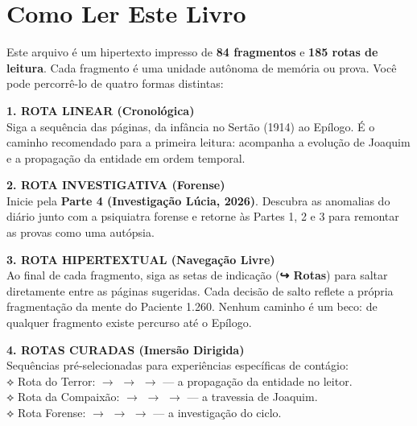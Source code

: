 \cleardoublepage
\thispagestyle{empty}
\chapter*{Como Ler Este Livro}

\begingroup

Este arquivo é um hipertexto impresso de \textbf{84 fragmentos} e \textbf{185 rotas de leitura}. Cada fragmento é uma unidade autônoma de memória ou prova. Você pode percorrê-lo de quatro formas distintas:

\vspace{0.8em}

\noindent\textbf{1. ROTA LINEAR (Cronológica)}\\
\noindent Siga a sequência das páginas, da infância no Sertão (1914) ao Epílogo. É o caminho recomendado para a primeira leitura: acompanha a evolução de Joaquim e a propagação da entidade em ordem temporal.

\vspace{0.5em}

\noindent\textbf{2. ROTA INVESTIGATIVA (Forense)}\\
\noindent Inicie pela \textbf{Parte 4 (Investigação Lúcia, 2026)}. Descubra as anomalias do diário junto com a psiquiatra forense e retorne às Partes 1, 2 e 3 para remontar as provas como uma autópsia.

\vspace{0.5em}

\noindent\textbf{3. ROTA HIPERTEXTUAL (Navegação Livre)}\\
\noindent Ao final de cada fragmento, siga as setas de indicação (\textbf{↪ Rotas}) para saltar diretamente entre as páginas sugeridas. Cada decisão de salto reflete a própria fragmentação da mente do Paciente 1.260. Nenhum caminho é um beco: de qualquer fragmento existe percurso até o Epílogo.

\vspace{0.5em}

\noindent\textbf{4. ROTAS CURADAS (Imersão Dirigida)}\\
\noindent Sequências pré-selecionadas para experiências específicas de contágio:\\[0.3em]
\noindent\textcolor{sangue}{⟡ Rota do Terror:}  $\rightarrow$  $\rightarrow$  $\rightarrow$  --- a propagação da entidade no leitor.\\[0.2em]
\noindent\textcolor{sangue}{⟡ Rota da Compaixão:}  $\rightarrow$  $\rightarrow$  $\rightarrow$  --- a travessia de Joaquim.\\[0.2em]
\noindent\textcolor{sangue}{⟡ Rota Forense:}  $\rightarrow$  $\rightarrow$  $\rightarrow$  --- a investigação do ciclo.

